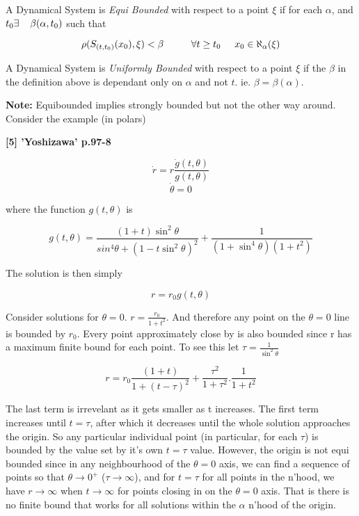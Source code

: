 \begin{defn}
  A Dynamical System is {\em Equi Bounded} with respect to a point
  $\xi$ if for each $\alpha$, and $t_{0} \exists \hspace{4mm}
  \beta (\alpha,t_{0})$ such that

  \[ \rho ( S_{(t,t_{0})}(x_{0}),\xi) < \beta \hspace{1cm} \forall t \geq
  					t_{0} \hspace{0.5cm} x_{0} \in
					\aleph_{\alpha}(\xi) \]
\end{defn}

\begin{defn}
  A Dynamical System is {\em Uniformly Bounded} with respect to a point
  $\xi$ if the $\beta$ in the definition above is dependant only on $\alpha$
  and not $t$. ie. $\beta = \beta (\alpha)$.
\end{defn}

{\bf Note:} Equibounded implies strongly bounded but not the other way
around. Consider the example (in polars)

\begin{eg}

{\bf [5] 'Yoshizawa' p.97-8}

\[ \dot{r} = r \frac{\dot{g}(t,\theta)}{g(t,\theta)} \]
\[ \dot{\theta} = 0 \]

where the function $g(t,\theta)$ is

\[ g(t,\theta) = \frac{(1+t) \sin^{2}\theta}{sin^{4}\theta +
		 (1-t \sin^{2}\theta)^{2}} + \frac{1}{(1+\sin^{4} \theta)
		 (1+t^{2})} \]

The solution is then simply

\[ r = r_{0} g(t,\theta) \]

Consider solutions for $\theta = 0$. $r = \frac{r_{0}}{1+ t^2}$. And
therefore any point on the $\theta = 0$ line is bounded by $r_{0}$. Every
point approximately close by is also bounded since r has a maximum finite
bound for each point. To see this let $\tau = \frac{1}{\sin^{2}\theta}$

\[ r = r_{0} \frac{(1 + t)}{1 + (t - \tau)^{2}} +
		\frac{\tau^{2}}{1+\tau^{2}} . \frac{1}{1 + t^{2}} \]

The last term is irrevelant as it gets smaller as t increases.
The first term increases until $t = \tau$, after which it decreases until
the whole solution approaches the origin. So any particular individual point
(in particular, for each $\tau$) is bounded by the value set by it's own $t
= \tau$ value.  However, the origin is not equi bounded since in any
neighbourhood of the $\theta = 0$ axis, we can find a sequence of points so
that $\theta \rightarrow 0^{+}$ ($\tau \rightarrow \infty$), and for $t =
\tau$ for all points in the n'hood, we have $r \rightarrow \infty$ when $t
\rightarrow \infty$ for points closing in on the $\theta = 0$ axis. That is
there is no finite bound that works for all solutions within the $\alpha$
n'hood of the origin.
\end{eg}

